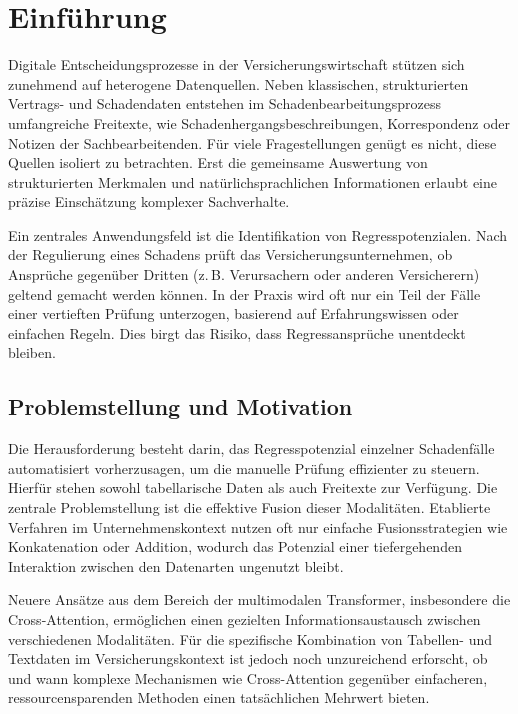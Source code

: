 \section{Einführung}
\label{sec:einleitung}

Digitale Entscheidungsprozesse in der Versicherungswirtschaft stützen sich zunehmend auf heterogene Datenquellen. Neben klassischen, strukturierten Vertrags- und Schadendaten entstehen im Schadenbearbeitungsprozess umfangreiche Freitexte, wie Schadenhergangsbeschreibungen, Korrespondenz oder Notizen der Sachbearbeitenden. Für viele Fragestellungen genügt es nicht, diese Quellen isoliert zu betrachten. Erst die gemeinsame Auswertung von strukturierten Merkmalen und natürlichsprachlichen Informationen erlaubt eine präzise Einschätzung komplexer Sachverhalte.

Ein zentrales Anwendungsfeld ist die Identifikation von Regresspotenzialen. Nach der Regulierung eines Schadens prüft das Versicherungsunternehmen, ob Ansprüche gegenüber Dritten (z.\,B. Verursachern oder anderen Versicherern) geltend gemacht werden können. In der Praxis wird oft nur ein Teil der Fälle einer vertieften Prüfung unterzogen, basierend auf Erfahrungswissen oder einfachen Regeln. Dies birgt das Risiko, dass Regressansprüche unentdeckt bleiben.

\subsection{Problemstellung und Motivation}

Die Herausforderung besteht darin, das Regresspotenzial einzelner Schadenfälle automatisiert vorherzusagen, um die manuelle Prüfung effizienter zu steuern. Hierfür stehen sowohl tabellarische Daten als auch Freitexte zur Verfügung. Die zentrale Problemstellung ist die effektive Fusion dieser Modalitäten. Etablierte Verfahren im Unternehmenskontext nutzen oft nur einfache Fusionsstrategien wie Konkatenation oder Addition, wodurch das Potenzial einer tiefergehenden Interaktion zwischen den Datenarten ungenutzt bleibt.

Neuere Ansätze aus dem Bereich der multimodalen Transformer, insbesondere die Cross-Attention, ermöglichen einen gezielten Informationsaustausch zwischen verschiedenen Modalitäten. Für die spezifische Kombination von Tabellen- und Textdaten im Versicherungskontext ist jedoch noch unzureichend erforscht, ob und wann komplexe Mechanismen wie Cross-Attention gegenüber einfacheren, ressourcensparenden Methoden einen tatsächlichen Mehrwert bieten.

